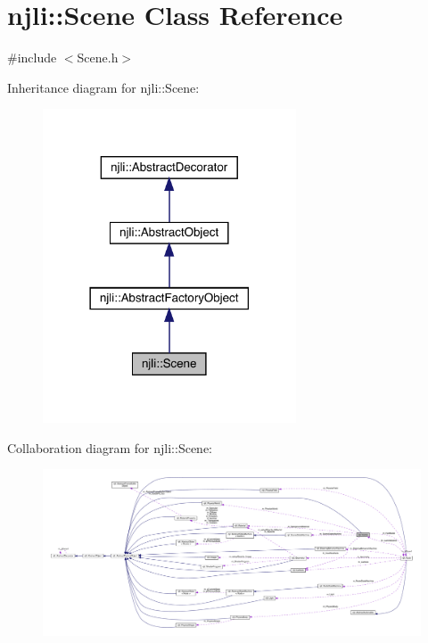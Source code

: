 \hypertarget{classnjli_1_1_scene}{}\section{njli\+:\+:Scene Class Reference}
\label{classnjli_1_1_scene}


{\ttfamily \#include $<$Scene.\+h$>$}



Inheritance diagram for njli\+:\+:Scene\+:\nopagebreak
\begin{figure}[H]
\begin{center}
\leavevmode
\includegraphics[width=213pt]{classnjli_1_1_scene__inherit__graph}
\end{center}
\end{figure}


Collaboration diagram for njli\+:\+:Scene\+:\nopagebreak
\begin{figure}[H]
\begin{center}
\leavevmode
\includegraphics[width=350pt]{classnjli_1_1_scene__coll__graph}
\end{center}
\end{figure}
